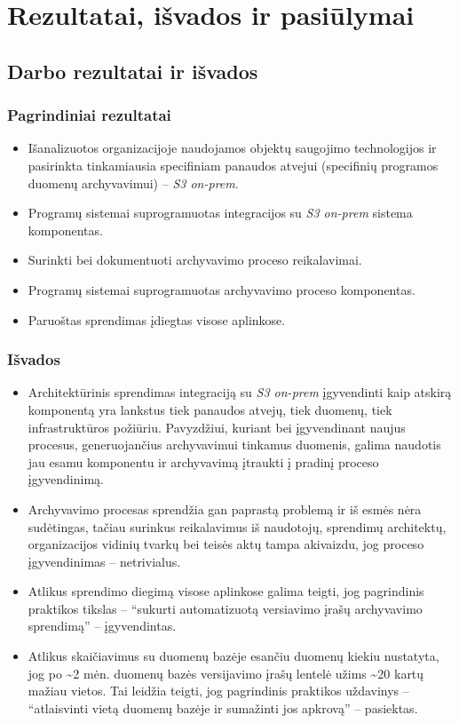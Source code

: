 \section{Rezultatai, išvados ir pasiūlymai}

\subsection{Darbo rezultatai ir išvados}

\subsubsection*{Pagrindiniai rezultatai}

\begin{itemize}
    \item Išanalizuotos organizacijoje naudojamos objektų saugojimo technologijos ir pasirinkta tinkamiausia specifiniam panaudos atvejui (specifinių programos duomenų archyvavimui) -- \textit{S3 on-prem}.
    \item Programų sistemai suprogramuotas integracijos su \textit{S3 on-prem} sistema komponentas.
    \item Surinkti bei dokumentuoti archyvavimo proceso reikalavimai.
    \item Programų sistemai suprogramuotas archyvavimo proceso komponentas.
    \item Paruoštas sprendimas įdiegtas visose aplinkose.
\end{itemize}

\subsubsection*{Išvados}

\begin{itemize}
    \item Architektūrinis sprendimas integraciją su \textit{S3 on-prem} įgyvendinti kaip atskirą komponentą yra lankstus tiek panaudos atvejų, tiek duomenų, tiek infrastruktūros požiūriu. Pavyzdžiui, kuriant bei įgyvendinant naujus procesus, generuojančius archyvavimui tinkamus duomenis, galima naudotis jau esamu komponentu ir archyvavimą įtraukti į pradinį proceso įgyvendinimą.
    \item Archyvavimo procesas sprendžia gan paprastą problemą ir iš esmės nėra sudėtingas, tačiau surinkus reikalavimus iš naudotojų, sprendimų architektų, organizacijos vidinių tvarkų bei teisės aktų tampa akivaizdu, jog proceso įgyvendinimas -- netrivialus.
    \item Atlikus sprendimo diegimą visose aplinkose galima teigti, jog pagrindinis praktikos tikslas -- \enquote{sukurti automatizuotą versiavimo įrašų archyvavimo sprendimą} -- įgyvendintas.
    \item Atlikus skaičiavimus su duomenų bazėje esančiu duomenų kiekiu nustatyta, jog po \sim  2 mėn. duomenų bazės versijavimo įrašų lentelė užims \sim 20 kartų mažiau vietos. Tai leidžia teigti, jog pagrindinis praktikos uždavinys -- \enquote{atlaisvinti vietą duomenų bazėje ir sumažinti jos apkrovą} -- pasiektas.
\end{itemize}

